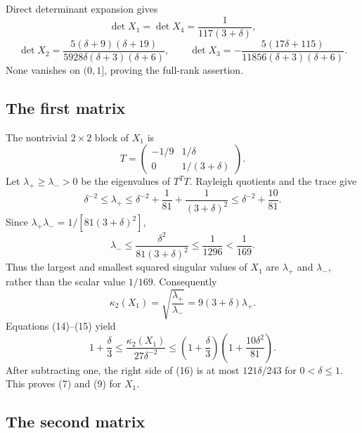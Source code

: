 \documentclass[11pt]{article}
\begin{document}
Direct determinant expansion gives
\[
\det X_1=\det X_4=\frac1{117(3+\delta)},
\]
\[
\det X_2=\frac{5(\delta+9)(\delta+19)}
 {5928\delta(\delta+3)(\delta+6)},\qquad
\det X_3=-\frac{5(17\delta+115)}
 {11856(\delta+3)(\delta+6)}.
\tag{13}
\]
None vanishes on $(0,1]$, proving the full-rank assertion.

\subsection*{The first matrix}

The nontrivial $2\times2$ block of $X_1$ is
\[
T=\begin{pmatrix}-1/9&1/\delta\\0&1/(3+\delta)\end{pmatrix}.
\]
Let $\lambda_+\geq\lambda_->0$ be the eigenvalues of $T^TT$.  Rayleigh
quotients and the trace give
\[
\delta^{-2}\leq\lambda_+\leq
\delta^{-2}+\frac1{81}+\frac1{(3+\delta)^2}
\leq\delta^{-2}+\frac{10}{81}.
\tag{14}
\]
Since $\lambda_+\lambda_-=1/[81(3+\delta)^2]$,
\[
\lambda_-\leq\frac{\delta^2}{81(3+\delta)^2}
\leq\frac1{1296}<\frac1{169}.
\tag{15}
\]
Thus the largest and smallest squared singular values of $X_1$ are
$\lambda_+$ and $\lambda_-$, rather than the scalar value $1/169$.
Consequently
\[
\kappa_2(X_1)=\sqrt{\frac{\lambda_+}{\lambda_-}}
=9(3+\delta)\lambda_+.
\]
Equations (14)--(15) yield
\[
1+\frac\delta3\leq
\frac{\kappa_2(X_1)}{27\delta^{-2}}
\leq\left(1+\frac\delta3\right)
       \left(1+\frac{10\delta^2}{81}\right).
\tag{16}
\]
After subtracting one, the right side of (16) is at most
$121\delta/243$ for $0<\delta\leq1$.  This proves (7) and (9) for $X_1$.

\subsection*{The second matrix}
\end{document}
